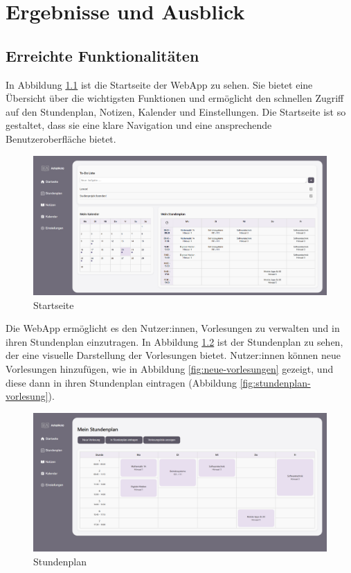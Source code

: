 \chapter{Ergebnisse und Ausblick}
\section{Erreichte Funktionalitäten}

In Abbildung \ref{fig:startseite} ist die Startseite der WebApp zu sehen. Sie bietet eine Übersicht über die wichtigsten Funktionen und ermöglicht den schnellen Zugriff auf den Stundenplan, Notizen, Kalender und Einstellungen. Die Startseite ist so gestaltet, dass sie eine klare Navigation und eine ansprechende Benutzeroberfläche bietet.\newline
\begin{figure}[H]
  \centering
  \includegraphics[width=1\textwidth]{./images/startseite.png}
  \caption{Startseite}
  \label{fig:startseite}
\end{figure}

Die WebApp ermöglicht es den Nutzer:innen, Vorlesungen zu verwalten und in ihren Stundenplan einzutragen. In Abbildung \ref{fig:stundenplan} ist der Stundenplan zu sehen, der eine visuelle Darstellung der Vorlesungen bietet. Nutzer:innen können neue Vorlesungen hinzufügen, wie in Abbildung \ref{fig:neue-vorlesungen} gezeigt, und diese dann in ihren Stundenplan eintragen (Abbildung \ref{fig:stundenplan-vorlesung}).\newline
\begin{figure}[H]
  \centering
  \includegraphics[width=1\textwidth]{./images/stundenplan.png}
  \caption{Stundenplan}
  \label{fig:stundenplan}
\end{figure}

